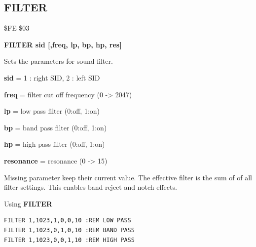 
\newpage
\subsection{FILTER}
\begin{description}[leftmargin=2cm,style=nextline]
\item [Token:] \$FE \$03
\item [Format:] {\bf FILTER sid [,freq, lp, bp, hp, res]}
\item [Usage:] Sets the parameters for sound filter.

      {\bf sid} = 1 : right SID, 2 : left SID

      {\bf freq} = filter cut off frequency (0 -> 2047)

      {\bf lp} = low pass filter (0:off, 1:on)

      {\bf bp} = band pass filter (0:off, 1:on)

      {\bf hp} = high pass filter (0:off, 1:on)

      {\bf resonance} = resonance (0 -> 15)

\item [Remarks:] Missing parameter keep their current value.
                 The effective filter is the sum of
                 of all filter settings.
                 This enables band reject and notch effects.

\item [Example:]
                Using {\bf FILTER}
\begin{tcolorbox}[colback=black,coltext=white]
\verbatimfont{\codefont}
\begin{verbatim}
FILTER 1,1023,1,0,0,10 :REM LOW PASS
FILTER 1,1023,0,1,0,10 :REM BAND PASS
FILTER 1,1023,0,0,1,10 :REM HIGH PASS
\end{verbatim}
\end{tcolorbox}
\end{description}


\newpage
